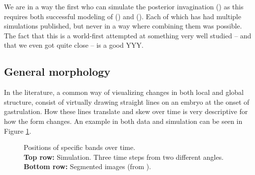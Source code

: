 We are in a way the first who can simulate the posterior invagination () as this requires both successful modeling of () and (). Each of which has had multiple simulations published, but never in a way where combining them was possible. \\
The fact that this is a world-first attempted at something very well studied -- and that we even got quite close -- is a good YYY.


\subsection{General morphology}
In the literature, a common way of visualizing changes in both local and global structure, consist of virtually drawing straight lines on an embryo at the onset of gastrulation. How these lines translate and skew over time is very descriptive for how the form changes. An example in both data and simulation can be seen in Figure \ref{fig:band-movements-stas}.

\begin{figure}[H]
    \centering
\end{figure}
\begin{figure}[H]
    \centering
    \caption{Positions of specific bands over time. \\ \textbf{Top row:} Simulation. Three time steps from two different angles.\\ \textbf{Bottom row:}  Segmented images (from ). \\}
    \label{fig:band-movements-stas}
\end{figure}

